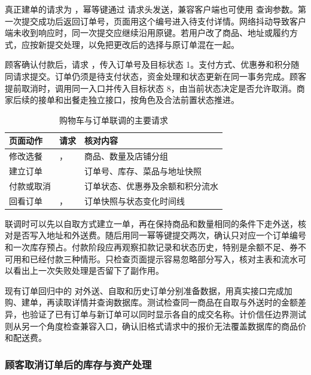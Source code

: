 真正建单的请求为 ，幂等键通过  请求头发送，兼容客户端也可使用  查询参数。第一次提交成功后返回订单号，页面用这个编号进入待支付详情。网络抖动导致客户端未收到响应时，同一次提交应继续沿用原键。若用户改了商品、地址或履约方式，应按新提交处理，以免把更改后的选择与原订单混在一起。

顾客确认付款后，请求 ，传入订单号及目标状态 1。支付方式、优惠券和积分随同请求提交。订单仍须是待支付状态，资金处理和状态更新在同一事务完成。顾客提前取消时，调用同一入口并传入目标状态 8，由当前状态决定是否允许取消。商家后续的接单和出餐走独立接口，按角色及合法前置状态推进。

\begin{table}[!htbp]
  \centering
  \caption{购物车与订单联调的主要请求}\label{tab:def-api-submit}
  \reporttablesize
  \begin{tabularx}{\linewidth}{@{}L{.18\linewidth}L{.38\linewidth}Y@{}}
  \toprule
  页面动作 & 请求 & 核对内容 \\
  \midrule
  修改选餐 & ， & 商品、数量及店铺分组 \\
  建立订单 &  & 订单号、库存、菜品与地址快照 \\
  付款或取消 &  & 订单状态、优惠券及余额和积分流水 \\
  回看订单 & ， & 订单快照与状态变化时间线 \\
  \bottomrule
  \end{tabularx}
\end{table}

联调时可以先以自取方式建立一单，再在保持商品和数量相同的条件下走外送，核对是否写入地址和外送费。随后用同一幂等键提交两次，确认只对应一个订单编号和一次库存预占。付款阶段应再观察扣款记录和状态历史，特别是余额不足、券不可用和已经付款三种情形。只检查页面提示容易忽略部分写入，核对主表和流水可以看出上一次失败处理是否留下了副作用。

现有订单回归中的  对外送、自取和历史订单分别准备数据，用真实接口完成加购、建单，再读取详情并查询数据库。测试检查同一商品在自取与外送时的金额差异，也验证了已有订单与新订单可以同时显示各自的成交名称。计价信任边界测试则从另一个角度检查兼容入口，确认旧格式请求中的报价无法覆盖数据库的商品价和配送费。

\subsubsection{顾客取消订单后的库存与资产处理}

